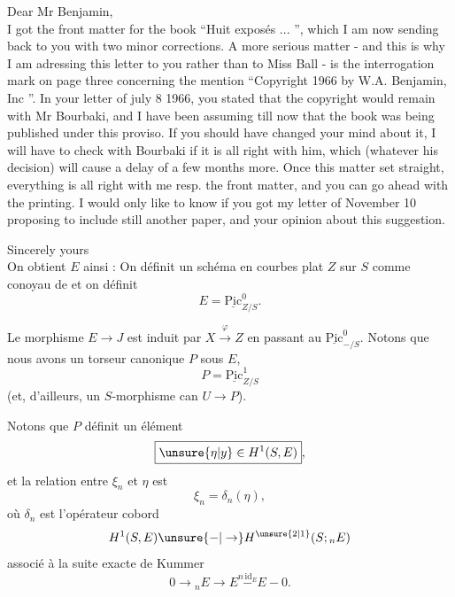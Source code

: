 Dear Mr Benjamin,\\

I got the front matter for the book ``Huit exposés ... '', which I am now sending back to you with two minor corrections. A more serious matter - and this is why I am adressing this letter to you rather than to Miss Ball  - is the interrogation mark on page three concerning the mention ``Copyright 1966 by W.A. Benjamin, Inc ''. In your letter of july 8 1966, you stated that the copyright would remain with Mr Bourbaki, and I have been assuming till now that the book was being published under this proviso. If you should have changed your mind about it, I will have to check with Bourbaki if it is all right with him, which (whatever his decision) will cause a delay of a few months more. Once this matter set straight, everything is all right with me resp. the front matter, and you can go ahead with the printing. I would only like to know if you got my letter of November 10 proposing to include still another paper, and your opinion about this suggestion.

Sincerely yours\\

On obtient $E$ ainsi :  On définit un schéma en courbes plat $Z$ sur $S$ comme conoyau de
et on définit
\[
E=\underline{\mathrm{Pic}}^{0}_{Z/S}.
\]

 Le morphisme $E\to J$ est induit par $X\xrightarrow{\varphi} Z$ en passant au $\underline{\mathrm{Pic}}^{0}_{-/S}$. Notons que nous avons un torseur canonique $P$ sous $E$,
\[
P=\underline{\mathrm{Pic}}^{1}_{Z/S}
\]
(et, d'ailleurs, un $S$-morphisme can $U\to P$).

Notons que $P$ définit un élément
\[
\boxed{\unsure{\eta|y}\in H^1(S,E)},
\]
et la relation entre $\xi_n$ et $\eta$ est
\[
\boxed{\xi_n=\delta_n(\eta)},
\]
où $\delta_n$ est l'opérateur cobord
\[
H^1(S,E)\unsure{-|\to}H^{\unsure{2|1}}(S;{}_{n}E)
\]
associé à la suite exacte de Kummer
\[
0\to{}_{n}E\to E\overset{n\,\mathrm{id}_E}{-}E-0.
\]

